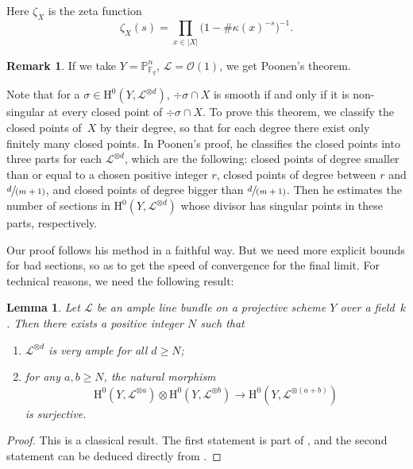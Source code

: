\documentclass[JEP,XML,SOM,Unicode,published]{cedram}
\newcommand{\spfrac}[2]{\sfrac{#1}{(#2)}}
\newenvironment{enumeratei}
{\bgroup\def\theenumi{\roman{enumi}}\def\theenumii{\arabic{enumii}}\begin{enumerate}}
{\end{enumerate}\egroup}
\theoremstyle{plain}
\newtheorem{lem}[thm]{Lemma}
\theoremstyle{definition}
\newtheorem*{rmq}{Remark}
\newcommand{\ho}{\mathrm{H}}
\newcommand{\li}{\mathcal{L}}
\newcommand{\pr}{\mathbb{P}}
\newcommand{\F}{\mathbb{F}}
\begin{document}
Here $\zeta_X$ is the zeta function
\[
\zeta_X(s)=\prod_{x\in |X|}\big(1-\#\kappa(x)^{-s}\big)^{-1}.
\]

\begin{rmq}
If we take $Y=\pr^n_{\F_q}$, $\li=\mathcal{O}(1)$, we get Poonen's theorem.
\end{rmq}

Note that for a $\sigma\in \ho^0(Y, \mathcal{L}^{\otimes{d}})$, $\div \sigma\cap X$ is smooth if and only if it is non-singular at every closed point of $\div \sigma\cap X$. To prove this theorem, we classify the closed points of~$X$ by their degree, so that for each degree there exist only finitely many closed points. In Poonen's proof, he classifies the closed points into three parts for each $\li^{\otimes d}$, which are the following: closed points of degree smaller than or equal to a chosen positive integer $r$, closed points of degree between $r$ and $\spfrac{d}{m+1}$, and closed points of degree bigger than $\spfrac{d}{m+1}$. Then he estimates the number of sections in $\ho^0(Y, \mathcal{L}^{\otimes d})$ whose divisor has singular points in these parts, respectively.

Our proof follows his method in a faithful way. But we need more explicit bounds for bad sections, so as to get the speed of convergence for the final limit. For technical reasons, we need the following result:
\begin{lem}\label{ample}
Let $\li$ be an ample line bundle on a projective scheme $Y$ over a field~$k$. Then there exists a positive integer $N$ such that
\begin{enumeratei}
\item $\li^{\otimes d}$ is very ample for all $d\geq N$;
\item for any $a, b\geq N$, the natural morphism
\[
\ho^0(Y,\li^{\otimes a})\otimes \ho^0(Y,\li^{\otimes b})\to \ho^0(Y,\li^{\otimes (a+b)})
\]
is surjective.
\end{enumeratei}
\end{lem}
\begin{proof}
This is a classical result. The first statement is part of \cite[Th.\,1.2.6]{La04}, and the second statement can be deduced directly from \cite[Th.\,1.8.3]{La04}.
\end{proof}
\end{document}
